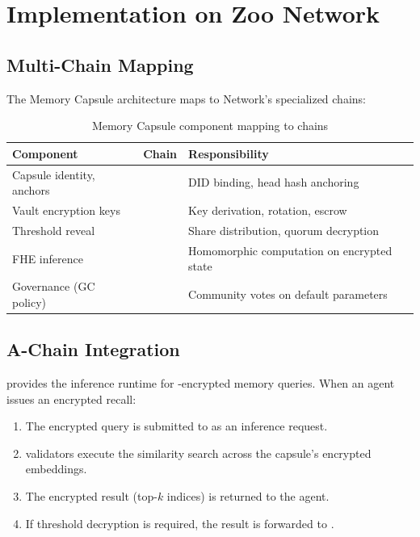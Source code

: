 \section{Implementation on Zoo Network}

\label{sec:implementation}

\subsection{Multi-Chain Mapping}

The Memory Capsule architecture maps to \Zoo{} Network's specialized chains:

\begin{table}[h]
\centering
\begin{tabular}{lll}
\toprule
\textbf{Component} & \textbf{Chain} & \textbf{Responsibility} \\
\midrule
Capsule identity, anchors & \IChain{} & DID binding, head hash anchoring \\
Vault encryption keys & \KChain{} & Key derivation, rotation, escrow \\
Threshold reveal & \TChain{} & Share distribution, quorum decryption \\
FHE inference & \AChain{} & Homomorphic computation on encrypted state \\
Governance (GC policy) & \GChain{} & Community votes on default parameters \\
\bottomrule
\end{tabular}
\caption{Memory Capsule component mapping to \Zoo{} chains}
\label{tab:chain_mapping}
\end{table}

\subsection{A-Chain Integration}

\AChain{} provides the inference runtime for \FHE{}-encrypted memory queries. When an agent issues an encrypted recall:

\begin{enumerate}
    \item The encrypted query is submitted to \AChain{} as an inference request.
    \item \AChain{} validators execute the \CKKS{} similarity search across the capsule's encrypted embeddings.
    \item The encrypted result (top-$k$ indices) is returned to the agent.
    \item If threshold decryption is required, the result is forwarded to \TChain{}.
\end{enumerate}

